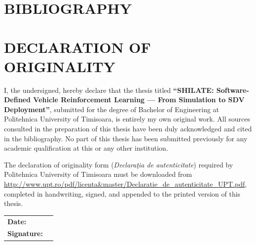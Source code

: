 \documentclass[12pt,a4paper]{article}
\begin{document}
\section*{\centering BIBLIOGRAPHY}
\vspace{2\baselineskip}

\printbibliography[heading=none]

\clearpage

\section*{\centering DECLARATION OF ORIGINALITY}
\vspace{2\baselineskip}

\noindent I, the undersigned, hereby declare that the thesis titled
\textbf{``SHILATE: Software-Defined Vehicle Reinforcement Learning --- From
Simulation to SDV Deployment''}, submitted for the degree of Bachelor of
Engineering at Politehnica University of Timisoara, is entirely my own original
work. All sources consulted in the preparation of this thesis have been duly
acknowledged and cited in the bibliography. No part of this thesis has been
submitted previously for any academic qualification at this or any other
institution.

\vspace{3cm}

\noindent The declaration of originality form (\emph{Declaraţia de autenticitate})
required by Politehnica University of Timisoara must be downloaded from\\
\url{http://www.upt.ro/pdf/licenta\&master/Declaratie_de_autenticitate_UPT.pdf},
completed in handwriting, signed, and appended to the printed version of
this thesis.

\vspace{3cm}

\begin{tabular}{ll}
  \textbf{Date:} & \underline{\hspace{5cm}} \\[1.5cm]
  \textbf{Signature:} & \underline{\hspace{5cm}} \\
\end{tabular}
\end{document}
